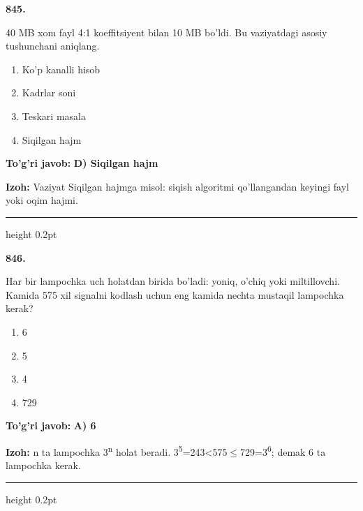 \documentclass[10pt,a4paper,oneside]{article}
\begin{document}
\noindent\textbf{\color{ink}845.}
\par
40 MB xom fayl 4:1 koeffitsiyent bilan 10 MB bo'ldi. Bu vaziyatdagi asosiy tushunchani aniqlang.
\begin{enumerate}[label=\Alph*),leftmargin=9mm]
\item Ko'p kanalli hisob
\item Kadrlar soni
\item Teskari masala
\item Siqilgan hajm
\end{enumerate}
\begin{tcolorbox}[enhanced,breakable,colback=teal!4,colframe=teal!50!black,boxrule=0.5pt,arc=1.1mm,left=3mm,right=3mm,top=1.7mm,bottom=1.7mm,before skip=2mm,after skip=2mm]
\textbf{\color{teal}To'g'ri javob:} \textbf{D) Siqilgan hajm}
\par\smallskip
\textbf{Izoh:} Vaziyat Siqilgan hajmga misol: siqish algoritmi qo'llangandan keyingi fayl yoki oqim hajmi.
\end{tcolorbox}
\vspace{2mm}\hrule height 0.2pt \vspace{3mm}

\noindent\textbf{\color{ink}846.}
\par
Har bir lampochka uch holatdan birida bo'ladi: yoniq, o'chiq yoki miltillovchi. Kamida 575 xil signalni kodlash uchun eng kamida nechta mustaqil lampochka kerak?
\begin{enumerate}[label=\Alph*),leftmargin=9mm]
\item 6
\item 5
\item 4
\item 729
\end{enumerate}
\begin{tcolorbox}[enhanced,breakable,colback=teal!4,colframe=teal!50!black,boxrule=0.5pt,arc=1.1mm,left=3mm,right=3mm,top=1.7mm,bottom=1.7mm,before skip=2mm,after skip=2mm]
\textbf{\color{teal}To'g'ri javob:} \textbf{A) 6}
\par\smallskip
\textbf{Izoh:} n ta lampochka 3\textsuperscript{n} holat beradi. 3\textsuperscript{5}=243\textless{}575\ensuremath{\leq}729=3\textsuperscript{6}; demak 6 ta lampochka kerak.
\end{tcolorbox}
\vspace{2mm}\hrule height 0.2pt \vspace{3mm}
\end{document}
